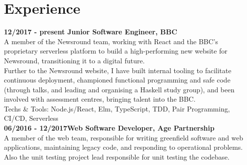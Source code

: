 \section{Experience}

\textbf{12/2017 - present \hspace{2.75em}Junior Software Engineer, BBC}\\

A member of the Newsround team, working with React and the BBC's proprietary serverless platform to build a high-performing new website for Newsround, transitioning it to a digital future.\\

Further to the Newsround website, I have built internal tooling to facilitate continuous deployment, championed functional programming and safe code (through talks, and leading and organising a Haskell study group), and been involved with assessment centres, bringing talent into the BBC.\\

Techs \& Tools: Node.js/React, Elm, TypeScript, TDD, Pair Programming, CI/CD, Serverless\\

\textbf{06/2016 - 12/2017\hspace{2.75em}Web Software Developer, Age Partnership}\\

A member of the web team, responsible for writing greenfield software and web applications, maintaining legacy code, and responding to operational problems. Also the unit testing project lead responsible for unit testing the codebase.
